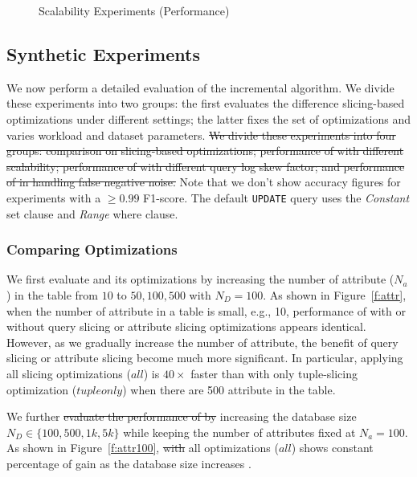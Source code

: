 \begin{figure}[h]
    \caption{Scalability Experiments (Performance)}
  \end{figure}
\fi

\subsection{Synthetic  Experiments}
\label{sec:experiments:synth}
We now perform a detailed evaluation of the  incremental algorithm.
We divide these experiments into two groups: the first evaluates the difference slicing-based 
optimizations under different settings; the latter fixes the set of optimizations and varies workload and dataset parameters.
\sout{We divide these experiments into four groups: comparison on slicing-based optimizations;  
performance of \sys with different scalability; performance of \sys with different
query log skew factor; and performance of \sys in handling false negative noise. }
Note that we don't show accuracy figures for experiments with a $\ge 0.99$ F1-score.
The default \texttt{UPDATE} query uses the \textit{Constant} set clause and \textit{Range} where clause. 

\subsubsection{Comparing Optimizations}

We first evaluate \sys and its optimizations by increasing the number of attribute ($N_a$)
in the table from $10$ to $50, 100, 500$ with $N_D = 100$. As shown 
in Figure~\ref{f:attr}, when the number of attribute in a table is small, e.g., 10, 
performance of \sys with or without query slicing or attribute slicing optimizations 
appears identical. However, as we gradually increase the number of attribute, the benefit
of query slicing or attribute slicing become much more significant. 
In particular, applying all slicing optimizations ($all$) is $40\times$ faster than \sys with only tuple-slicing 
optimization  ($tuple only$) when there are 500 attribute in the table.  

We further \sout{evaluate the performance of \sys by} increasing the database size $N_D \in \{100,500, 1k, 5k\}$ while keeping the number of attributes fixed at $N_a = 100$. 
As shown in Figure~\ref{f:attr100}, \sout{\sys with} all optimizations 
($all$) shows constant percentage of gain as the database size increases .

